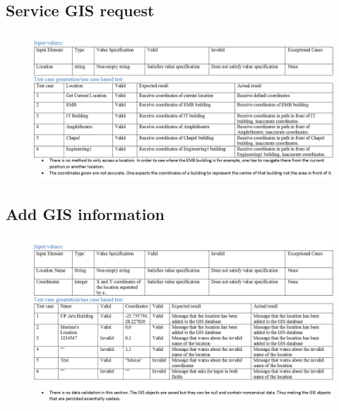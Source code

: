 \documentclass[english]{article}
\begin{document}
\subsection{Service GIS request}
\begin{figure}[ht!]
\hspace*{-2.5cm} 
\includegraphics[width=180mm]{ServiceGISReq.png}
\end{figure}
\subsection{Add GIS information}
\begin{figure}[ht!]
\hspace*{-2.5cm} 
\includegraphics[width=180mm]{AddGISInformation.png}
\end{figure}
\end{document}
